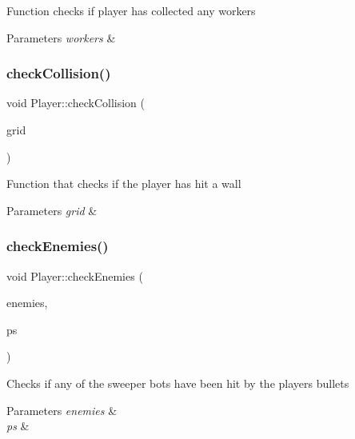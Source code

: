 Function checks if player has collected any workers 


\begin{DoxyParams}{Parameters}
{\em workers} & \\
\hline
\end{DoxyParams}
\mbox{\label{class_player_ac486bbf1b2b679490c29e096b8d3617e}} 
\subsubsection{\texorpdfstring{checkCollision()}{checkCollision()}}
{\footnotesize\ttfamily void Player\+::check\+Collision (\begin{DoxyParamCaption}\item[{\mbox{\hyperlink{class_grid}{Grid}} \&}]{grid }\end{DoxyParamCaption})}



Function that checks if the player has hit a wall 


\begin{DoxyParams}{Parameters}
{\em grid} & \\
\hline
\end{DoxyParams}
\mbox{\label{class_player_a6054f91ea6df9f3b31d2a8ed9067d77e}} 
\subsubsection{\texorpdfstring{checkEnemies()}{checkEnemies()}}
{\footnotesize\ttfamily void Player\+::check\+Enemies (\begin{DoxyParamCaption}\item[{std\+::vector$<$ \mbox{\hyperlink{class_enemy}{Enemy}} $\ast$ $>$ \&}]{enemies,  }\item[{std\+::vector$<$ \mbox{\hyperlink{class_particle_system}{Particle\+System}} $\ast$ $>$ \&}]{ps }\end{DoxyParamCaption})}



Checks if any of the sweeper bots have been hit by the players bullets 


\begin{DoxyParams}{Parameters}
{\em enemies} & \\
\hline
{\em ps} & \\
\hline
\end{DoxyParams}
\mbox{\label{class_player_a3fd7e9acb89b30b0976248c41ae2f8d3}} 
